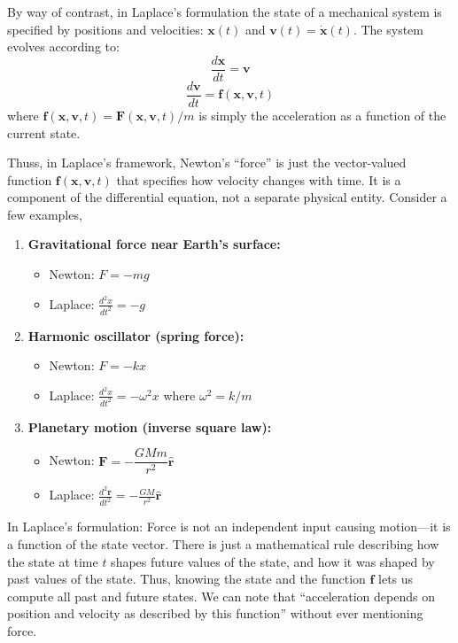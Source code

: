 \documentclass[12pt]{article}
\begin{document}
By way of contrast, in Laplace's formulation the state of a mechanical system is specified by positions and velocities: $\mathbf{x}(t)$ and $\mathbf{v}(t) = \dot{\mathbf{x}}(t)$. The system evolves according to:
\[
\frac{d\mathbf{x}}{dt} = \mathbf{v}
\]
\[
\frac{d\mathbf{v}}{dt} = \mathbf{f}(\mathbf{x}, \mathbf{v}, t)
\]
where $\mathbf{f}(\mathbf{x}, \mathbf{v}, t) = \mathbf{F}(\mathbf{x}, \mathbf{v}, t)/m$ is simply the acceleration as a function of the current state.

Thuss, in Laplace's framework, Newton's ``force'' is just the vector-valued function $\mathbf{f}(\mathbf{x}, \mathbf{v}, t)$ that specifies how velocity changes with time. It is a component of the differential equation, not a separate physical entity.
Consider a few examples, 
%

\begin{enumerate}
\item \textbf{Gravitational force near Earth's surface:}
\begin{itemize}
\item Newton: $F = -mg$
\item Laplace: $\displaystyle\frac{d^2x}{dt^2} = -g$
\end{itemize}

\item \textbf{Harmonic oscillator (spring force):}
\begin{itemize}
\item Newton: $F = -kx$
\item Laplace: $\displaystyle\frac{d^2x}{dt^2} = -\omega^2 x$ where $\omega^2 = k/m$
\end{itemize}

\item \textbf{Planetary motion (inverse square law):}
\begin{itemize}
\item Newton: $\mathbf{F} = -\dfrac{GMm}{r^2}\hat{\mathbf{r}}$
\item Laplace: $\displaystyle\frac{d^2\mathbf{r}}{dt^2} = -\frac{GM}{r^2}\hat{\mathbf{r}}$
\end{itemize}
\end{enumerate}


In Laplace's formulation:
Force is not an independent input causing motion---it is a function of the state vector.
There is just a mathematical rule describing how the state at time $t$ shapes future values of the state, and how it was shaped by past values of the state.
Thus, 
knowing the state and the function $\mathbf{f}$ lets us compute all past and future states.
We can note that ``acceleration depends on position and velocity as described by this function'' without ever mentioning force.
\end{document}
